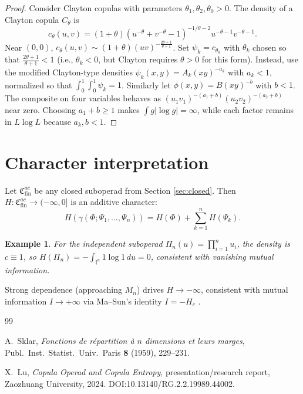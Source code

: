 \documentclass[11pt]{amsart}
\newtheorem{example}[theorem]{Example}
\newcommand{\I}{\mathbb I}
\begin{document}
\begin{sloppypar}
\begin{proof}
Consider Clayton copulas with parameters $\theta_{1},\theta_{2},\theta_{0}>0$. The density of a Clayton copula $C_{\theta}$ is
\[
c_{\theta}(u,v)=(1+\theta)(u^{-\theta}+v^{-\theta}-1)^{-1/\theta-2}u^{-\theta-1}v^{-\theta-1}.
\]
Near $(0,0)$, $\displaystyle c_{\theta}(u,v)\sim (1+\theta)(uv)^{-\frac{2\theta+1}{\theta+1}}$. Set $\psi_{k}=c_{\theta_{k}}$ with $\theta_{k}$ chosen so that $\displaystyle \frac{2\theta+1}{\theta+1}<1$ (i.e., $\theta_{k}<0$, but Clayton requires $\theta>0$ for this form). Instead, use the modified Clayton-type densities $\psi_{k}(x,y)=A_{k}(xy)^{-a_{k}}$ with $a_{k}<1$, normalized so that $\displaystyle \int_{0}^{1}\int_{0}^{1}\psi_{k}=1$. Similarly let $\phi(x,y)=B(xy)^{-b}$ with $b<1$. The composite on four variables behaves as $(u_{1}v_{1})^{-(a_{1}+b)}(u_{2}v_{2})^{-(a_{2}+b)}$ near zero. Choosing $a_{1}+b\geq 1$ makes $\displaystyle \int g|\log g|=\infty$, while each factor remains in $L\log L$ because $a_{k},b<1$.
\end{proof}

\section{Character interpretation}
\label{sec:character}
Let $\mathfrak{C}_{\mathrm{fin}}^{ac}$ be any closed suboperad from Section \ref{sec:closed}. Then $H:\mathfrak{C}_{\mathrm{fin}}^{ac}\to(-\infty,0]$ is an additive character:
\[ \displaystyle H(\gamma(\Phi;\Psi_{1},\dots,\Psi_{n}))=H(\Phi)+\sum_{k=1}^{n}H(\Psi_{k}). \]

\begin{example}
\label{ex:independent}
For the independent suboperad $\Pi_{n}(u)=\prod_{i=1}^{n}u_{i}$, the density is $c\equiv 1$, so $\displaystyle H(\Pi_{n})=-\int_{\I^{n}}1\log 1\,du=0$, consistent with vanishing mutual information.
\end{example}

Strong dependence (approaching $M_{n}$) drives $H\to-\infty$, consistent with mutual information $I\to+\infty$ via Ma--Sun's identity $I=-H_{c}$ \cite{masun}.

\begin{thebibliography}{99}

A.~Sklar, \emph{Fonctions de r\'epartition \`a $n$ dimensions et leurs marges}, Publ.\ Inst.\ Statist.\ Univ.\ Paris \textbf{8} (1959), 229--231.

X.~Lu, \emph{Copula Operad and Copula Entropy}, presentation/research report, Zaozhuang University, 2024. DOI:10.13140/RG.2.2.19989.44002.



\end{thebibliography}
\end{sloppypar}
\end{document}
